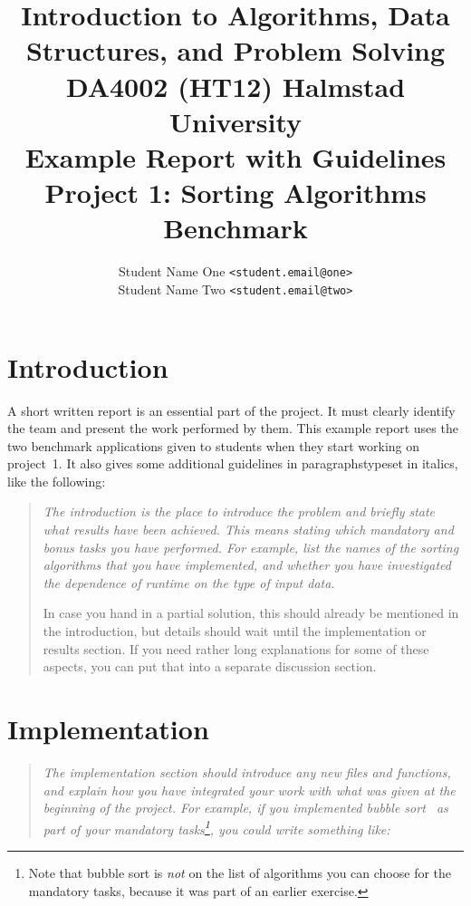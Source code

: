 \documentclass[a4paper,10pt]{article}
\begin{document}
\title{
  {\normalsize
    Introduction to Algorithms, Data Structures, and Problem Solving\\
    DA4002 (HT12) Halmstad University}\\
  Example Report with Guidelines\\
  Project 1: Sorting Algorithms Benchmark
}
\author{
  Student Name One \texttt{<student.email@one>}\\
  Student Name Two \texttt{<student.email@two>}
}
\maketitle



\section{Introduction}

A short written report is an essential part of the project.
It must clearly identify the team and present the work performed by them.
This example report uses the two benchmark applications given to students when they start working on project~1.
It also gives some additional guidelines in paragraphstypeset in italics, like the following:

\begin{quotation}
  \itshape
  The introduction is the place to introduce the problem and briefly state what results have been achieved.
  This means stating which mandatory and bonus tasks you have performed.
  For example, list the names of the sorting algorithms that you have implemented, and whether you have investigated the dependence of runtime on the type of input data.
  
  In case you hand in a partial solution, this should already be mentioned in the introduction, but details should wait until the implementation or results section.
  If you need rather long explanations for some of these aspects, you can put that into a separate discussion section.
\end{quotation}



\section{Implementation}

\begin{quotation}
  \itshape
  The implementation section should introduce any new files and functions, and explain how you have integrated your work with what was given at the beginning of the project.
  For example, if you implemented bubble sort~\cite{wikipedia:bubble-sort} as part of your mandatory tasks\footnote{
    Note that bubble sort is \emph{not} on the list of algorithms you can choose for the mandatory tasks, because it was part of an earlier exercise.
  },
  you could write something like:
\end{quotation}
\end{document}
